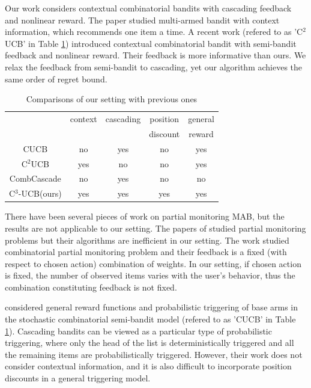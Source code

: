 \documentclass{article}
\begin{document}
Our work considers contextual combinatorial bandits with cascading feedback and nonlinear reward. The paper \cite{li2010contextual} studied multi-armed bandit with context information, which recommends one item a time. A recent work \cite{qin2014contextual} (refered to as 'C$^2$UCB' in Table \ref{table:outline}) introduced contextual combinatorial bandit with semi-bandit feedback and nonlinear reward. Their feedback is more informative than ours. We relax the feedback from semi-bandit to cascading, yet our algorithm achieves the same order of regret bound.

\begin{table}
	\renewcommand{\arraystretch}{1.1}
	\centering
	\begin{tabular}{|c|c|c|c|c|}
		\hline
		&context &cascading &position  & general \\
		&         &          &discount & reward \\
		\hline
		CUCB &no &yes &no & yes \\
		\hline
		C$^2$UCB &yes &no &no & yes  \\
		\hline
		CombCascade	&no &yes &no  & no \\
		\hline
		C$^3$-UCB(ours) &yes &yes &yes & yes \\
		\hline
	\end{tabular}
	\caption{Comparisons of our setting with previous ones }
	\label{table:outline}
\end{table} 

There have been several pieces of work on partial monitoring MAB, but the results are not applicable to our setting. The papers of \cite{agrawal1989asymptotically,bartok2012adaptive} studied partial monitoring problems but their algorithms are inefficient in our setting. The work \cite{lin2014combinatorial} studied combinatorial partial monitoring problem and their feedback is a fixed (with respect to chosen action) combination of weights. In our setting, if chosen action is fixed, the number of observed items varies with the user's behavior, thus the combination constituting feedback is not fixed.

\citet{chen2015combinatorial} considered general reward functions and probabilistic triggering of base arms
	in the  stochastic combinatorial semi-bandit model (refered to as 'CUCB' in Table \ref{table:outline}).
Cascading bandits can be viewed as a particular type of probabilistic triggering, where
	only the head of the list is deterministically triggered and all the remaining items are
	probabilistically triggered.
However, their work does not consider contextual information, and it is also difficult to
	incorporate position discounts in a general triggering model.
\end{document}

